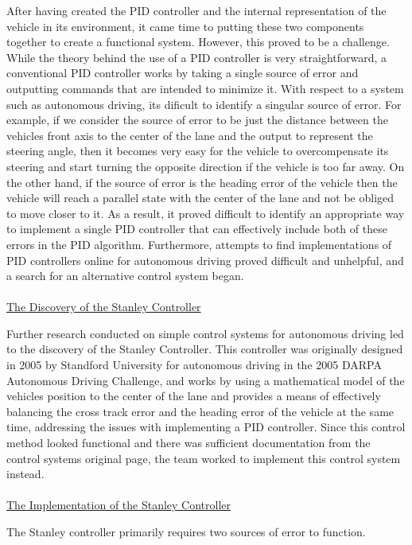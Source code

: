 \documentclass[titlepage]{article}
\begin{document}
{After having created the PID controller and the internal representation of the vehicle in its environment, it came time to putting these two components together to create a functional system. However, this proved to be a challenge. While the theory behind the use of a PID controller is very straightforward, a conventional PID controller works by taking a single source of error and outputting commands that are intended to minimize it. With respect to a system such as autonomous driving, its dificult to identify a singular source of error. For example, if we consider the source of error to be just the distance between the vehicles front axis to the center of the lane and the output to represent the steering angle, then it becomes very easy for the vehicle to overcompensate its steering and start turning the opposite direction if the vehicle is too far away. On the other hand, if the source of error is the heading error of the vehicle then the vehicle will reach a parallel state with the center of the lane and not be obliged to move closer to it. As a result, it proved difficult to identify an appropriate way to implement a single PID controller that can effectively include both of these errors in the PID algorithm. Furthermore, attempts to find implementations of PID controllers online for autonomous driving proved difficult and unhelpful, and a search for an alternative control system began.\\~\\
\underline{The Discovery of the Stanley Controller}

Further research conducted on simple control systems for autonomous driving led to the discovery of the Stanley Controller. This controller was originally designed in 2005 by Standford University for autonomous driving in the 2005 DARPA Autonomous Driving Challenge, and works by using a mathematical model of the vehicles position to the center of the lane and provides a means of effectively balancing the cross track error and the heading error of the vehicle at the same time, addressing the issues with implementing a PID controller. Since this control method looked functional and there was sufficient documentation from the control systems original page, the team worked to implement this control system instead.\\~\\
\underline{The Implementation of the Stanley Controller}

The Stanley controller primarily requires two sources of error to function.

}
\end{document}

